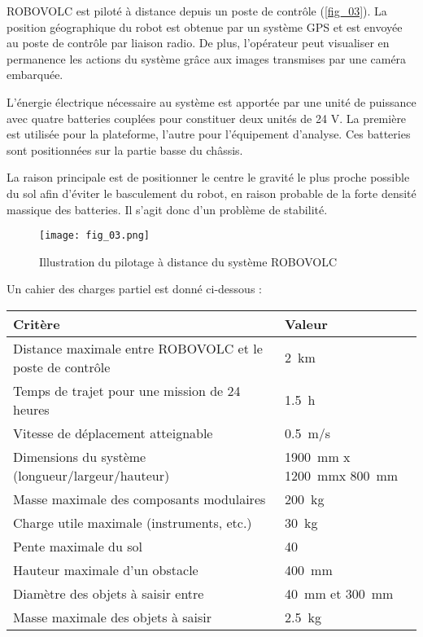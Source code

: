 ROBOVOLC est piloté à distance depuis un poste de contrôle (\autoref{fig_03}). La position géographique
du robot est obtenue par un système GPS et est envoyée au poste de contrôle par liaison radio.
De plus, l’opérateur peut visualiser en permanence les actions du système grâce aux images
transmises par une caméra embarquée.

L'énergie électrique nécessaire au système est apportée par une unité de puissance avec quatre
batteries couplées pour constituer deux unités de 24 V. La première est utilisée pour la plateforme,
l'autre pour l'équipement d'analyse. Ces batteries sont positionnées sur la partie basse du châssis.

\ifprof
\begin{corrige}
 La raison principale est de positionner le centre le gravité le plus proche possible du sol afin d’éviter le basculement du robot, en raison probable de la forte densité massique des batteries. Il s’agit donc d’un problème de stabilité.
\end{corrige}
\else
\fi

\begin{figure}[H]
\centering
\texttt{[image: fig\_03.png]}
\caption{Illustration du pilotage à distance du système ROBOVOLC\label{fig_03}}
\end{figure}

Un cahier des charges partiel est donné ci-dessous :

\begin{center}
\begin{tabular}{ll}
\hline
\textbf{Critère} & \textbf{Valeur} \\ \hline \hline
Distance maximale entre ROBOVOLC et le poste de contrôle & \SI{2}{km} \\ \hline  
Temps de trajet pour une mission de 24 heures 		& \SI{1,5}{h} \\ \hline 
Vitesse de déplacement atteignable 				& \SI{0,5}{m/s} \\ \hline 
Dimensions du système (longueur/largeur/hauteur) 		& \SI{1900}{mm} x \SI{1200}{mm}x \SI{800}{mm}\\ \hline 
Masse maximale des composants modulaires 			& \SI{200}{kg} \\ \hline 
Charge utile maximale (instruments, etc.) 			& \SI{30}{kg} \\ \hline 
Pente maximale du sol 						& 40\degres \\ \hline 
Hauteur maximale d'un obstacle 					& \SI{400}{mm} \\ \hline 
Diamètre des objets à saisir entre 				& \SI{40}{mm} et \SI{300}{mm} \\ \hline 
Masse maximale des objets à saisir 				& \SI{2,5}{kg} \\ \hline 
\end{tabular}
\end{center}



